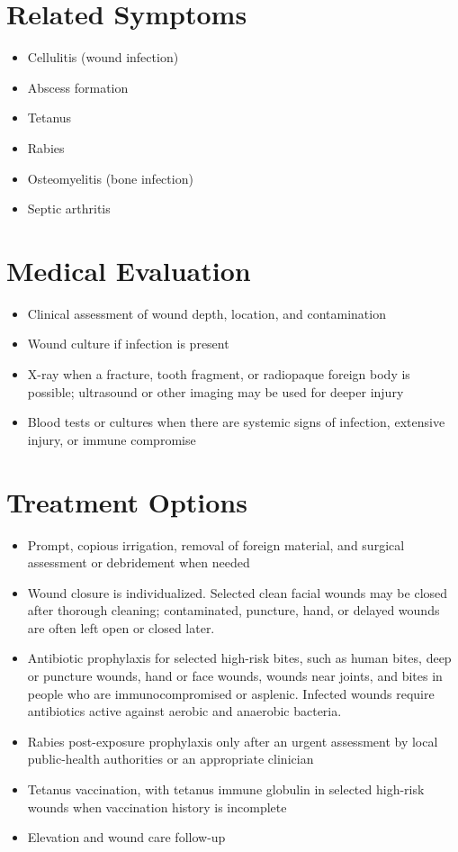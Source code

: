 \section*{Related Symptoms}
\begin{itemize}
\item Cellulitis (wound infection)
\item Abscess formation
\item Tetanus
\item Rabies
\item Osteomyelitis (bone infection)
\item Septic arthritis
\end{itemize}

\section*{Medical Evaluation}
\begin{itemize}
\item Clinical assessment of wound depth, location, and contamination
\item Wound culture if infection is present
\item X-ray when a fracture, tooth fragment, or radiopaque foreign body is possible; ultrasound or other imaging may be used for deeper injury
\item Blood tests or cultures when there are systemic signs of infection, extensive injury, or immune compromise
\end{itemize}

\section*{Treatment Options}
\begin{itemize}
\item Prompt, copious irrigation, removal of foreign material, and surgical assessment or debridement when needed
\item Wound closure is individualized. Selected clean facial wounds may be closed after thorough cleaning; contaminated, puncture, hand, or delayed wounds are often left open or closed later.
\item Antibiotic prophylaxis for selected high-risk bites, such as human bites, deep or puncture wounds, hand or face wounds, wounds near joints, and bites in people who are immunocompromised or asplenic. Infected wounds require antibiotics active against aerobic and anaerobic bacteria.
\item Rabies post-exposure prophylaxis only after an urgent assessment by local public-health authorities or an appropriate clinician
\item Tetanus vaccination, with tetanus immune globulin in selected high-risk wounds when vaccination history is incomplete
\item Elevation and wound care follow-up
\end{itemize}

